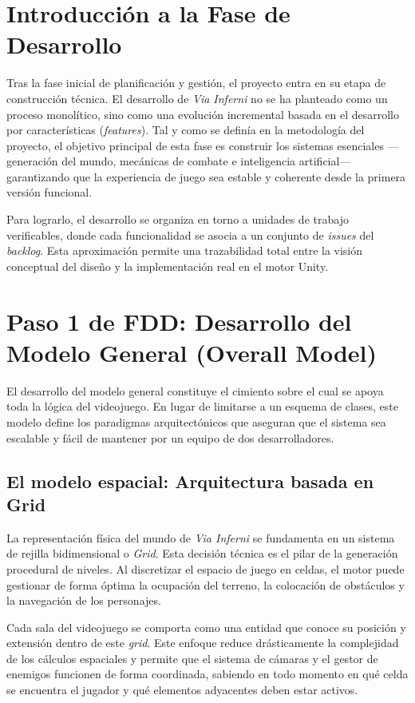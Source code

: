\section{Introducción a la Fase de Desarrollo}
Tras la fase inicial de planificación y gestión, el proyecto entra en su etapa de construcción técnica. El desarrollo de \textit{Via Inferni} no se ha planteado como un proceso monolítico, sino como una evolución incremental basada en el desarrollo por características (\textit{features}). Tal y como se definía en la metodología del proyecto, el objetivo principal de esta fase es construir los sistemas esenciales —generación del mundo, mecánicas de combate e inteligencia artificial— garantizando que la experiencia de juego sea estable y coherente desde la primera versión funcional.

Para lograrlo, el desarrollo se organiza en torno a unidades de trabajo verificables, donde cada funcionalidad se asocia a un conjunto de \textit{issues} del \textit{backlog}. Esta aproximación permite una trazabilidad total entre la visión conceptual del diseño y la implementación real en el motor Unity.

\section{Paso 1 de FDD: Desarrollo del Modelo General (Overall Model)}
El desarrollo del modelo general constituye el cimiento sobre el cual se apoya toda la lógica del videojuego. En lugar de limitarse a un esquema de clases, este modelo define los paradigmas arquitectónicos que aseguran que el sistema sea escalable y fácil de mantener por un equipo de dos desarrolladores.

\subsection{El modelo espacial: Arquitectura basada en Grid}
La representación física del mundo de \textit{Via Inferni} se fundamenta en un sistema de rejilla bidimensional o \textit{Grid}. Esta decisión técnica es el pilar de la generación procedural de niveles. Al discretizar el espacio de juego en celdas, el motor puede gestionar de forma óptima la ocupación del terreno, la colocación de obstáculos y la navegación de los personajes.

Cada sala del videojuego se comporta como una entidad que conoce su posición y extensión dentro de este \textit{grid}. Este enfoque reduce drásticamente la complejidad de los cálculos espaciales y permite que el sistema de cámaras y el gestor de enemigos funcionen de forma coordinada, sabiendo en todo momento en qué celda se encuentra el jugador y qué elementos adyacentes deben estar activos.

